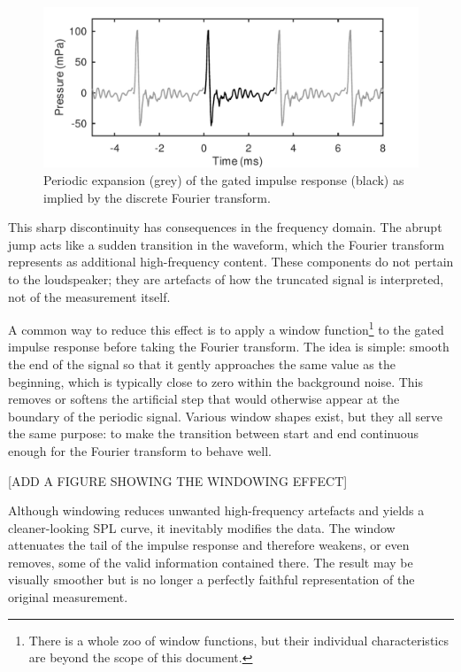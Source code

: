 \documentclass[12pt,a4paper]{article}
\providecommand{\figlabel}[1]{\label{fig:#1}}
\begin{document}
\begin{figure}[tbp]
  \begin{center}
    \includegraphics[width=\textwidth]{FIGURE3}
    \caption{Periodic expansion (grey) of the gated impulse response (black) as implied by the discrete Fourier transform.}
    \figlabel{FIGURE3}
  \end{center}
\end{figure}

This sharp discontinuity has consequences in the frequency domain. The abrupt jump acts like a sudden transition in the waveform, which the Fourier transform represents as additional high-frequency content. These components do not pertain to the loudspeaker; they are artefacts of how the truncated signal is interpreted, not of the measurement itself.

A common way to reduce this effect is to apply a window function\footnote{There is a whole zoo of window functions, but their individual characteristics are beyond the scope of this document.} to the gated impulse response before taking the Fourier transform. The idea is simple: smooth the end of the signal so that it gently approaches the same value as the beginning, which is typically close to zero within the background noise. This removes or softens the artificial step that would otherwise appear at the boundary of the periodic signal. Various window shapes exist, but they all serve the same purpose: to make the transition between start and end continuous enough for the Fourier transform to behave well.

[ADD A FIGURE SHOWING THE WINDOWING EFFECT]

Although windowing reduces unwanted high-frequency artefacts and yields a cleaner-looking SPL curve, it inevitably modifies the data. The window attenuates the tail of the impulse response and therefore weakens, or even removes, some of the valid information contained there. The result may be visually smoother but is no longer a perfectly faithful representation of the original measurement.
\end{document}
